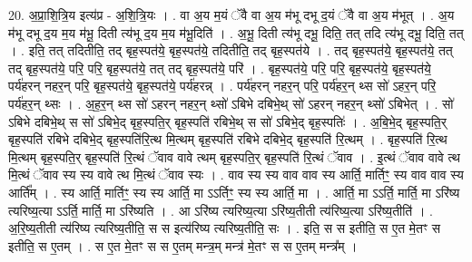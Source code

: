 \documentclass[17pt]{extarticle}
\begin{document}
20. अ॒प्रा॒शि॒त्रि॒य इत्य॑प्र - अ॒शि॒त्रि॒यः । . वा अ॒य म॒यं ॅवै वा अ॒य म॑भू दभू द॒यं ॅवै वा अ॒य म॑भूत् । . अ॒य म॑भू दभू द॒य म॒य म॑भू॒ दिती त्य॑भू द॒य म॒य म॑भू॒दिति॑ । . अ॒भू॒ दिती त्य॑भू दभू॒ दिति॒ तत् तदि त्य॑भू दभू॒ दिति॒ तत् । . इति॒ तत् तदितीति॒ तद् बृह॒स्पत॑ये॒ बृह॒स्पत॑ये॒ तदितीति॒ तद् बृह॒स्पत॑ये । . तद् बृह॒स्पत॑ये॒ बृह॒स्पत॑ये॒ तत् तद् बृह॒स्पत॑ये॒ परि॒ परि॒ बृह॒स्पत॑ये॒ तत् तद् बृह॒स्पत॑ये॒ परि॑ । . बृह॒स्पत॑ये॒ परि॒ परि॒ बृह॒स्पत॑ये॒ बृह॒स्पत॑ये॒ पर्य॑हरन् नहर॒न् परि॒ बृह॒स्पत॑ये॒ बृह॒स्पत॑ये॒ पर्य॑हरन्न् । . पर्य॑हरन् नहर॒न् परि॒ पर्य॑हर॒न् थ्स सो॑ ऽहर॒न् परि॒ पर्य॑हर॒न् थ्सः । . अ॒ह॒र॒न् थ्स सो॑ ऽहरन् नहर॒न् थ्सो॑ ऽबिभे दबिभे॒थ् सो॑ ऽहरन् नहर॒न् थ्सो॑ ऽबिभेत् । . सो॑ ऽबिभे दबिभे॒थ् स सो॑ ऽबिभे॒द् बृह॒स्पति॒र् बृह॒स्पति॑ रबिभे॒थ् स सो॑ ऽबिभे॒द् बृह॒स्पतिः॑ । . अ॒बि॒भे॒द् बृह॒स्पति॒र् बृह॒स्पति॑ रबिभे दबिभे॒द् बृह॒स्पति॑रि॒त्थ मि॒त्थम् बृह॒स्पति॑ रबिभे दबिभे॒द् बृह॒स्पति॑ रि॒त्थम् । . बृह॒स्पति॑ रि॒त्थ मि॒त्थम् बृह॒स्पति॒र् बृह॒स्पति॑ रि॒त्थं ॅवाव वावे त्थम् बृह॒स्पति॒र् बृह॒स्पति॑ रि॒त्थं ॅवाव । . इ॒त्थं ॅवाव वावे त्थ मि॒त्थं ॅवाव स्य स्य वावे त्थ मि॒त्थं ॅवाव स्यः । . वाव स्य स्य वाव वाव स्य आर्ति॒ मार्तिꣳ॒॒ स्य वाव वाव स्य आर्ति᳚म् । . स्य आर्ति॒ मार्तिꣳ॒॒ स्य स्य आर्ति॒ मा ऽऽर्तिꣳ॒॒ स्य स्य आर्ति॒ मा । . आर्ति॒ मा ऽऽर्ति॒ मार्ति॒ मा ऽरि॑ष्य त्यरिष्य॒त्या ऽऽर्ति॒ मार्ति॒ मा ऽरि॑ष्यति । . आ ऽरि॑ष्य त्यरिष्य॒त्या ऽरि॑ष्य॒तीती त्य॑रिष्य॒त्या ऽरि॑ष्य॒तीति॑ । . अ॒रि॒ष्य॒तीती त्य॑रिष्य त्यरिष्य॒तीति॒ स स इत्य॑रिष्य त्यरिष्य॒तीति॒ सः । . इति॒ स स इतीति॒ स ए॒त मे॒तꣳ स इतीति॒ स ए॒तम् । . स ए॒त मे॒तꣳ स स ए॒तम् मन्त्र॒म् मन्त्र॑ मे॒तꣳ स स ए॒तम् मन्त्र᳚म् । \newline
\end{document}
